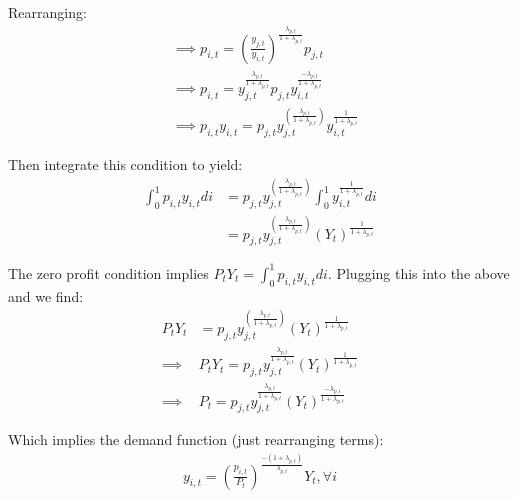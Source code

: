 Rearranging:
\begin{equation}
\begin{split}
&\implies p_{i,t} = \left(\frac{y_{j,t}}{y_{i,t}}\right)^{\frac{\lambda_{p,t}}{1+\lambda_{p,t}}}p_{j,t} \\
& \implies p_{i,t} = y_{j,t}^{\frac{\lambda_{p,t}}{1+\lambda_{p,t}}}p_{j,t}y_{i,t}^{\frac{-\lambda_{p,t}}{1+\lambda_{p,t}}} \\
& \implies p_{i,t}y_{i,t} = p_{j,t}y_{j,t}^{\left(\frac{\lambda_{p,t}}{1+\lambda_{p,t}}\right)}y_{i,t}^{\frac{1}{1+\lambda_{p,t}}}
\end{split}
\end{equation}

Then integrate this condition to yield:
\begin{equation}
\begin{split}
\int_{0}^{1}p_{i,t}y_{i,t}di & = p_{j,t}y_{j,t}^{\left(\frac{\lambda_{p,t}}{1+\lambda_{p,t}}\right)}\int_{0}^{1}y_{i,t}^{\frac{1}{1+\lambda_{p,t}}}di  \\
& = p_{j,t}y_{j,t}^{\left(\frac{\lambda_{p,t}}{1+\lambda_{p,t}}\right)}(Y_{t})^{\frac{1}{1+\lambda_{p,t}}}
\end{split}
\end{equation}

The zero profit condition implies $P_{t}Y_{t}=\int_{0}^{1}p_{i,t}y_{i,t}di$.  Plugging this into the above and we find:
\begin{equation}
\begin{split}
P_{t}Y_{t} &= p_{j,t}y_{j,t}^{\left(\frac{\lambda_{p,t}}{1+\lambda_{p,t}}\right)}(Y_{t})^{\frac{1}{1+\lambda_{p,t}}} \\
\implies &P_{t}Y_{t}=p_{j,t}y_{j,t}^{\frac{\lambda_{p,t}}{1+\lambda_{p,t}}}(Y_{t})^{\frac{1}{1+\lambda_{p,t}}} \\
\implies & P_{t} =  p_{j,t}y_{j,t}^{\frac{\lambda_{p,t}}{1+\lambda_{p,t}}}(Y_{t})^{\frac{-\lambda_{p,t}}{1+\lambda_{p,t}}}
\end{split}
\end{equation}

Which implies the demand function (just rearranging terms):
\begin{equation}
\begin{split}
y_{i,t} =  \left(\frac{p_{i,t}}{P_{t}}\right)^{\frac{-(1+\lambda_{p,t})}{\lambda_{p,t}}}Y_{t}, \forall i
\end{split}
\end{equation}

